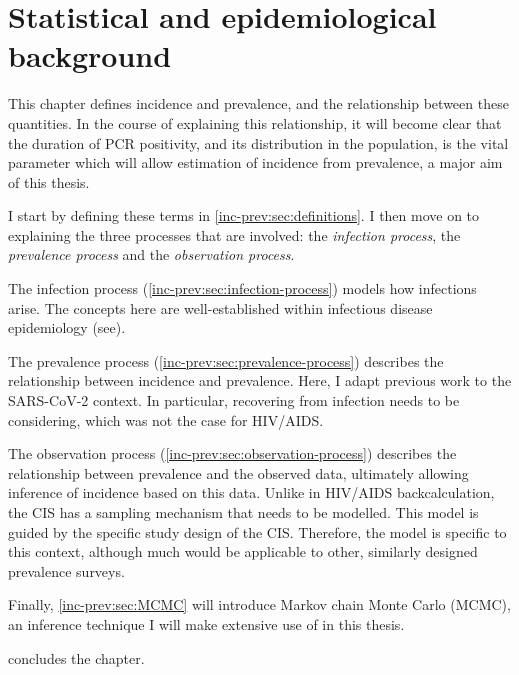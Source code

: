 \documentclass[thesis.tex]{subfiles}
\begin{document}
\ifSubfilesClassLoaded{
  \setcounter{chapter}{2}
}

\chapter{Statistical and epidemiological background} \label{inc-prev}


This chapter defines incidence and prevalence, and the relationship between these quantities.
In the course of explaining this relationship, it will become clear that the duration of PCR positivity, and its distribution in the population, is the vital parameter which will allow estimation of incidence from prevalence, a major aim of this thesis.

I start by defining these terms in \cref{inc-prev:sec:definitions}.
I then move on to explaining the three processes that are involved: the \emph{infection process}, the \emph{prevalence process} and the \emph{observation process}.

The infection process (\cref{inc-prev:sec:infection-process}) models how infections arise.
The concepts here are well-established within infectious disease epidemiology (see).

The prevalence process (\cref{inc-prev:sec:prevalence-process}) describes the relationship between incidence and prevalence.
Here, I adapt previous work to the SARS-CoV-2 context.
In particular, recovering from infection needs to be considering, which was not the case for HIV/AIDS.

The observation process (\cref{inc-prev:sec:observation-process}) describes the relationship between prevalence and the observed data, ultimately allowing inference of incidence based on this data.
Unlike in HIV/AIDS backcalculation, the CIS has a sampling mechanism that needs to be modelled.
This model is guided by the specific study design of the CIS.
Therefore, the model is specific to this context, although much would be applicable to other, similarly designed prevalence surveys.

Finally, \cref{inc-prev:sec:MCMC} will introduce Markov chain Monte Carlo (MCMC), an inference technique I will make extensive use of in this thesis.

 concludes the chapter.
\end{document}
